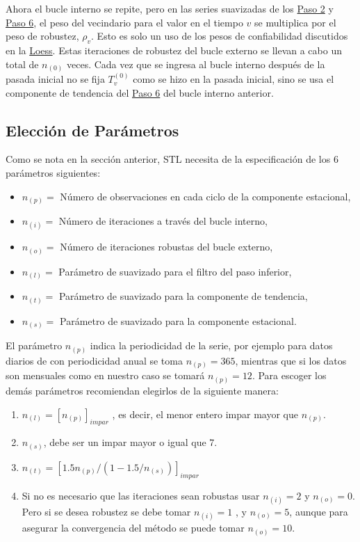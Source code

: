 \documentclass[12pt,oneside]{book}\usepackage[]{graphicx}\usepackage[]{color}
\theoremstyle{definition} %
\begin{document}
Ahora el bucle interno se repite, pero en las series suavizadas de los \hyperref[sbsec:paso2]{Paso 2} y \hyperref[sbsec:paso6]{Paso 6}, el peso del vecindario para el valor en el tiempo $v$ se multiplica por el peso de robustez, $\rho_v$. Esto es solo un uso de los pesos de confiabilidad discutidos en la \hyperref[sec:loess]{Loess}. Estas iteraciones de robustez del bucle externo se llevan a cabo un total de $n_{(0)}$ veces. Cada vez que se ingresa al bucle interno después de la pasada inicial no se fija $T_v^{(0)}$ como se hizo en la pasada inicial, sino se usa el componente de tendencia del \hyperref[sbsec:paso6]{Paso 6} del bucle interno anterior.

\subsection{Elección de Parámetros}

Como se nota en la sección anterior, STL necesita de la especificación de los 6 parámetros siguientes:
\begin{itemize}
\item $n_{(p)}=$ Número de observaciones en cada ciclo de la componente estacional,
\item $n_{(i)}=$ Número de iteraciones a través del bucle interno,
\item $n_{(o)}=$ Número de iteraciones robustas del bucle externo,
\item $n_{(l)}=$ Parámetro de suavizado para el filtro del paso inferior,
\item $n_{(t)}=$ Parámetro de suavizado para la componente de tendencia,
\item $n_{(s)}=$ Parámetro de suavizado para la componente estacional.
\end{itemize}



El parámetro $n_{(p)}$ indica la periodicidad de la serie, por ejemplo para datos diarios de con periodicidad anual se toma $n_{(p)}=365$, mientras que si los datos son mensuales como en nuestro caso se tomará $n_{(p)}=12$.
Para escoger los demás parámetros \citeauthor{cleveland1990stl} \citeyear{cleveland1990stl} recomiendan elegirlos de la siguiente manera:

\begin{enumerate}
\item $n_{(l)}= [n_{(p)}]_{impar}$ , es decir, el menor entero impar mayor que $n_{(p)}$.
\item $n_{(s)}$, debe ser un impar mayor o igual que 7.
\item $n_{(t)} = [ 1.5n_{(p)}/(1-1.5/n_{(s)})]_{impar}$
\item Si no es necesario que las iteraciones sean robustas usar $n_{(i)}=2$ y $n_{(o)}=0$. Pero si se desea robustez se debe tomar $n_{(i)}=1$ , y $n_{(o)}=5$, aunque para asegurar la convergencia del método se puede tomar $n_{(o)}=10$.
\end{enumerate}
\end{document}
